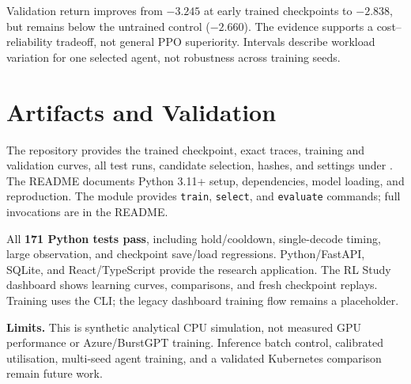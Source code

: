 \documentclass[10pt,a4paper,twocolumn]{article}
\begin{document}
\newpage
Validation return improves from $-3.245$ at early trained checkpoints to
$-2.838$, but remains below the untrained control ($-2.660$).
The evidence supports a cost--reliability tradeoff, not general PPO superiority.
Intervals describe workload variation for one selected agent, not robustness
across training seeds.

\section{Artifacts and Validation}
The repository provides the trained checkpoint, exact traces, training and
validation curves, all test runs, candidate selection, hashes, and settings
under . The README documents Python 3.11+ setup,
dependencies, model loading, and reproduction. The module
 provides \texttt{train},
\texttt{select}, and \texttt{evaluate} commands; full invocations are in the README.

All \textbf{171 Python tests pass}, including hold/cooldown, single-decode timing,
large observation, and checkpoint save/load regressions. Python/FastAPI, SQLite,
and React/TypeScript provide the research application. The RL Study dashboard
shows learning curves, comparisons, and fresh checkpoint replays. Training uses
the CLI; the legacy dashboard training flow remains a placeholder.

{\raggedright
\textbf{Limits.} This is synthetic analytical CPU simulation, not measured GPU
performance or Azure/BurstGPT training. Inference batch control, calibrated
utilisation, multi-seed agent training, and a validated Kubernetes comparison
remain future work.\par}
\end{document}
